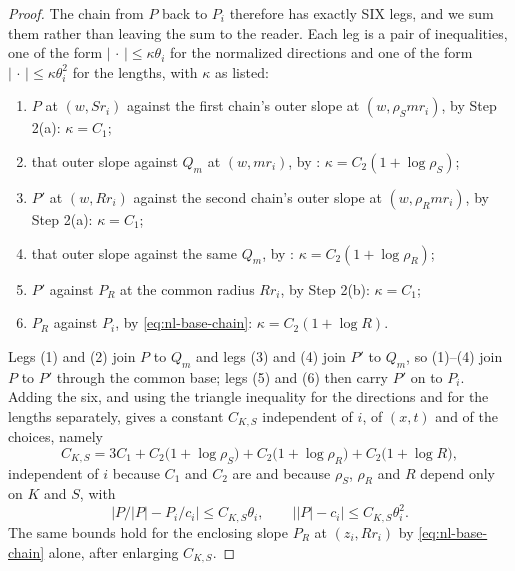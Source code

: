 \begin{proof}
The chain from $P$ back to $P_i$ therefore has exactly SIX legs, and we sum them
rather than leaving the sum to the reader. Each leg is a pair of inequalities, one of
the form $|\,\cdot\,|\le\kappa\theta_i$ for the normalized directions and one of the
form $|\,\cdot\,|\le\kappa\theta_i^2$ for the lengths, with $\kappa$ as listed:
\begin{enumerate}
\item[(1)] $P$ at $(w,Sr_i)$ against the first chain's outer slope at
$(w,\rho_Smr_i)$, by Step 2(a): $\kappa=C_1$;
\item[(2)] that outer slope against $Q_m$ at $(w,mr_i)$, by
: $\kappa=C_2(1+\log\rho_S)$;
\item[(3)] $P'$ at $(w,Rr_i)$ against the second chain's outer slope at
$(w,\rho_Rmr_i)$, by Step 2(a): $\kappa=C_1$;
\item[(4)] that outer slope against the same $Q_m$, by
: $\kappa=C_2(1+\log\rho_R)$;
\item[(5)] $P'$ against $P_R$ at the common radius $Rr_i$, by Step 2(b):
$\kappa=C_1$;
\item[(6)] $P_R$ against $P_i$, by \eqref{eq:nl-base-chain}:
$\kappa=C_2(1+\log R)$.
\end{enumerate}
Legs (1) and (2) join $P$ to $Q_m$ and legs (3) and (4) join $P'$ to $Q_m$, so
(1)--(4) join $P$ to $P'$ through the common base; legs (5) and (6) then carry $P'$
on to $P_i$. Adding the six, and using the triangle inequality for the directions and
for the lengths separately, gives a constant $C_{K,S}$ independent of $i$, of
$(x,t)$ and of the choices, namely
\[
  C_{K,S}=3C_1+C_2\bigl(1+\log\rho_S\bigr)+C_2\bigl(1+\log\rho_R\bigr)
     +C_2\bigl(1+\log R\bigr),
\]
independent of $i$ because $C_1$ and $C_2$ are and because $\rho_S$, $\rho_R$ and
$R$ depend only on $K$ and $S$, with
\begin{equation}\label{eq:nl-cmp}
  \bigl|P/|P|-P_i/c_i\bigr|\le C_{K,S}\theta_i,\qquad
  \bigl||P|-c_i\bigr|\le C_{K,S}\theta_i^2 .
\end{equation}
The same bounds hold for the enclosing slope $P_R$ at $(z_i,Rr_i)$ by
\eqref{eq:nl-base-chain} alone, after enlarging $C_{K,S}$.


\end{proof}
